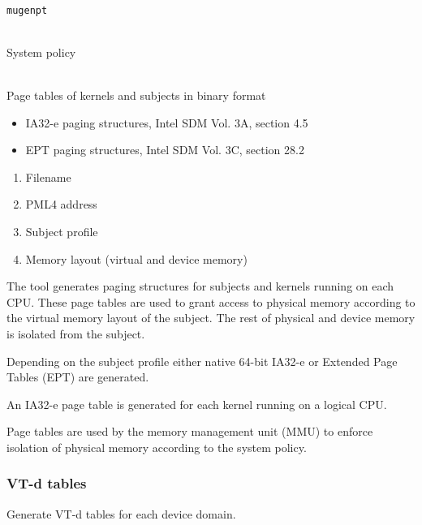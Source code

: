 \documentclass[a4paper,twoside,titlepage]{article}
\begin{document}
\begin{description} \itemsep1pt \parskip0pt
	\item[Name] \hfill \\
		\texttt{mugenpt}
	\item[Input] \hfill \\
		System policy
	\item[Output] \hfill \\
		Page tables of kernels and subjects in binary format
	\item[Output format] \hfill
		\begin{itemize}
			\item IA32-e paging structures, Intel SDM Vol. 3A, section 4.5
			\item EPT paging structures, Intel SDM Vol. 3C, section 28.2
		\end{itemize}
	\item[Data] \hfill
		\begin{enumerate}
			\item Filename
			\item PML4 address
			\item Subject profile
			\item Memory layout (virtual and device memory)
		\end{enumerate}
\end{description}

The tool generates paging structures for subjects and kernels running on each
CPU. These page tables are used to grant access to physical memory according to
the virtual memory layout of the subject. The rest of physical and device memory
is isolated from the subject.

Depending on the subject profile either native 64-bit IA32-e or Extended Page
Tables (EPT) are generated.

An IA32-e page table is generated for each kernel running on a logical CPU.

Page tables are used by the memory management unit (MMU) to enforce isolation of
physical memory according to the system policy.

\subsubsection{VT-d tables}
Generate VT-d tables for each device domain.
\end{document}
